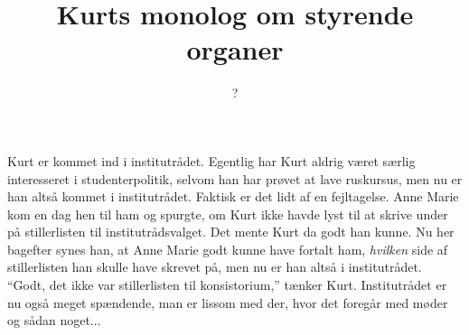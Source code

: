 \documentclass[a4paper,11pt]{article}
\title{Kurts monolog om styrende organer} %
\author{?}
\begin{document}
\maketitle
\begin{sketch}

    Kurt er kommet ind i institutrådet. Egentlig har Kurt aldrig været særlig interesseret i studenterpolitik, selvom han har prøvet at lave ruskursus, men nu er han altså kommet i institutrådet. Faktisk er det lidt af en fejltagelse. Anne Marie kom en dag hen til ham og spurgte, om Kurt ikke havde lyst til at skrive under på stillerlisten til institutrådsvalget. Det mente Kurt da godt han kunne. Nu her bagefter synes han, at Anne Marie godt kunne have fortalt ham, \emph{hvilken} side af stillerlisten han skulle have skrevet på, men nu er han altså i institutrådet. ``Godt, det ikke var stillerlisten til konsistorium,'' tænker Kurt. Institutrådet er nu også meget spændende, man er lissom med der, hvor det foregår med møder og sådan noget...

\end{sketch}
\end{document}
